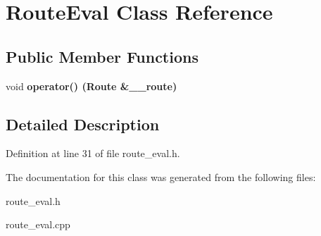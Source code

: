 \section{Route\-Eval Class Reference}
\label{class_route_eval}
\subsection*{Public Member Functions}
\begin{CompactItemize}
\item 
void \bf{operator()} (Route \&\_\-\_\-route)\label{class_route_eval_e10bbe6f792e6f44405953de4f703901}

\end{CompactItemize}


\subsection{Detailed Description}




Definition at line 31 of file route\_\-eval.h.

The documentation for this class was generated from the following files:\begin{CompactItemize}
\item 
route\_\-eval.h\item 
route\_\-eval.cpp\end{CompactItemize}
